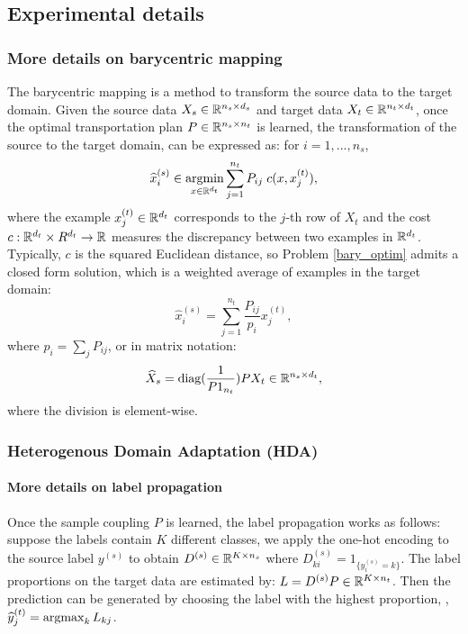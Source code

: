 \subsection{Experimental details} \label{sec_app:exp}

\subsubsection{More details on barycentric mapping}  \label{bary_mapping}

The barycentric mapping \citep{Ferradans14,Courty16} is a method to transform the source data
to the target domain. Given the source data $X_s \in \mathbb R^{n_s \times d_s}$ and
target data $X_t \in \mathbb R^{n_t \times d_t}$, once the optimal transportation plan
$P \in \mathbb R^{n_s \times n_t}$ is learned, the transformation of the source to the target domain,
can be expressed as: for $i = 1, ..., n_s$,
\begin{equation} \label{bary_optim}
    \widehat{x}_i^{(s)} \in \operatorname*{argmin}_{x \in \mathbb R^{d_t}}
    \sum_{j = 1}^{n_t} P_{ij} \; c(x, x_j^{(t)}),
\end{equation}
where the example $x^{(t)}_j \in \mathbb R^{d_t}$ corresponds to the $j$-th row of $X_t$ and
the cost $c: \mathbb R^{d_t} \times R^{d_t} \to \mathbb R$ measures the discrepancy between
two examples in $\mathbb R^{d_t}$. Typically, $c$ is the squared Euclidean distance,
so Problem \eqref{bary_optim} admits a closed form solution, which is a weighted average of
examples in the target domain:
\begin{equation}
    \widehat{x}_i^{(s)} = \sum_{j = 1}^{n_t} \frac{P_{ij}}{p_i} x_j^{(t)},
\end{equation}
where $p_i = \sum_{j} P_{ij}$, or in matrix notation:
\begin{equation} \label{transOT:1}
    \widehat{X}_s= \text{diag}(\frac{1}{P 1_{n_t}}) P X_t \in \mathbb R^{n_s \times d_t},
\end{equation}
where the division is element-wise.

\subsubsection{Heterogenous Domain Adaptation (HDA)}
\paragraph{More details on label propagation}

Once the sample coupling $P$ is learned, the label propagation works as follows:
suppose the labels contain $K$ different classes,
we apply the one-hot encoding to the source label $y^{(s)}$ to obtain
$D^{(s)} \in \mathbb R^{K \times n_s}$ where $D^{(s)}_{ki} = 1_{\{y^{(s)}_i = k\}}$.
The label proportions on the target data are
estimated by: $L = D^{(s)} P \in \mathbb R^{K \times n_t}$. Then the prediction can be generated
by choosing the label with the highest proportion, \ie, $\widehat{y}^{(t)}_j = \operatorname*{argmax}_k L_{kj}$.

